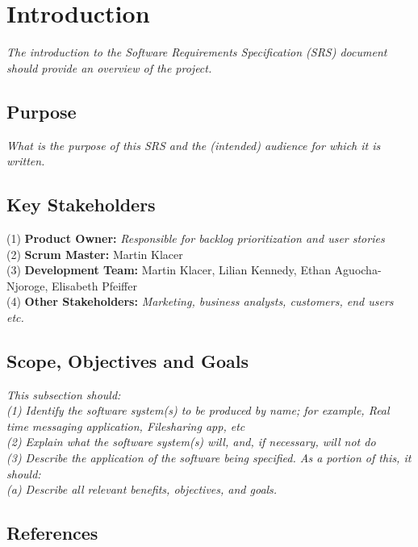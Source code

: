 \section{Introduction}

\textit{The introduction to the Software Requirements Specification (SRS) document should provide an overview of the project.}

\subsection{Purpose}

\textit{What is the purpose of this SRS and the (intended) audience for which it is written.}

\subsection{Key Stakeholders}

(1) \textbf{Product Owner:} \textit{Responsible for backlog prioritization and user stories} \\
(2) \textbf{Scrum Master:} Martin Klacer \\
(3) \textbf{Development Team:} Martin Klacer, Lilian Kennedy, Ethan Aguocha-Njoroge, Elisabeth Pfeiffer \\
(4) \textbf{Other Stakeholders:} \textit{Marketing, business analysts, customers, end users etc.} \\

\subsection{Scope, Objectives and Goals}

\textit{This subsection should:} \\
\textit{(1) Identify the software system(s) to be produced by name; for example, Real time messaging application, Filesharing app, etc} \\
\textit{(2) Explain what the software system(s) will, and, if necessary, will not do} \\
\textit{(3) Describe the application of the software being specified. As a portion of this, it should:} \\
\textit{  (a) Describe all relevant benefits, objectives, and goals.} \\

\subsection{References}

